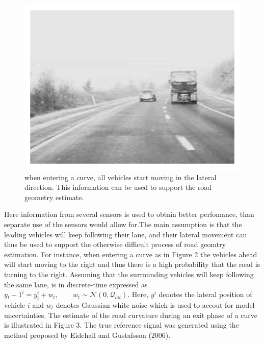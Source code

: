 \documentclass[11pt,oneside,a4paper]{article}
\begin{document}
\begin{figure}[H]
  \begin{center}
  \includegraphics[height=0.3\textheight]{./source/2.png}
  \caption{when entering a curve, all vehicles start moving in the lateral direction. This information
  can be used to support the road geometry estimate.}
  \label{}
  \end{center}
\end{figure}
Here information from several sensors is used to obtain better perfomance, than separate use of the sensors would allow for.The main
assumption is that the leading vehicles will keep following their lane, and their lateral movement can thus be used to support the otherwise
difficult process of road geomtry estimation. For instance, when entering a curve as in Figure 2 the vehicles ahead will start moving to
the right and thus there is a high probability that the road is turning to the right.
Assuming that the surrounding vehicles will keep following the same lane, is in discrete-time expressed as
$y{_t+1}^i = y_{t}^i + w_t,\qquad w_t \sim \mathcal{N}(0, \mathcal{Q}_{lat}). $ Here, $y^i $ denotes the lateral
position of vehicle $i $ and $w_t $ denotes Gaussian white noise which is used to accout for model uncertainties.
The estimate of the road curvature during an exit phase of a curve is illustrated in Figure 3. The true reference
signal was generated using the method proposed by Eidehall and Gustafsson (2006).
\end{document}
